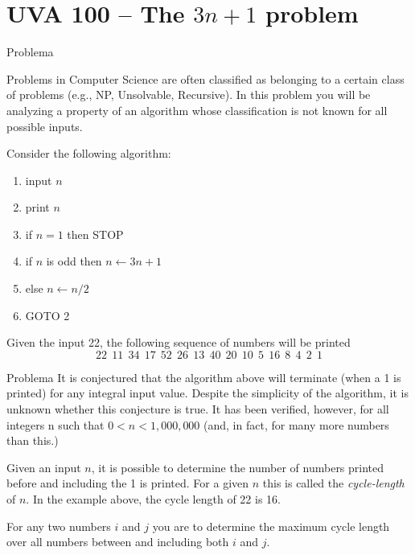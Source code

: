 \section{UVA 100 -- The $3n + 1$ problem}

\begin{frame}[fragile]{Problema}

Problems in Computer Science are often classified as belonging to a certain class of problems (e.g.,
NP, Unsolvable, Recursive). In this problem you will be analyzing a property of an algorithm whose
classification is not known for all possible inputs.

Consider the following algorithm:

\begin{enumerate}
\item input $n$
\item print $n$
\item if $n = 1$ then STOP
\item if $n$ is odd then $n \leftarrow 3n + 1$
\item else $n \leftarrow n/2$
\item GOTO 2
\end{enumerate}

Given the input 22, the following sequence of numbers will be printed
\[
22\ \ 11\ \ 34\ \ 17\ \ 52\ \ 26\ \ 13\ \ 40\ \ 20\ \ 10\ \ 5\ \ 16\ \ 8\ \ 4\ \ 2\ \ 1
\]
\end{frame}

\begin{frame}[fragile]{Problema}
It is conjectured that the algorithm above will terminate (when a 1 is printed) for any integral input
value. Despite the simplicity of the algorithm, it is unknown whether this conjecture is true. It has
been verified, however, for all integers n such that $0 < n < 1,000,000$ (and, in fact, for many more
numbers than this.)

Given an input $n$, it is possible to determine the number of numbers printed before and including
the 1 is printed. For a given $n$ this is called the \textit{cycle-length} of $n$. In the example above, the cycle
length of 22 is 16.

For any two numbers $i$ and $j$ you are to determine the maximum cycle length over all numbers
between and including both $i$ and $j$.
\end{frame}

